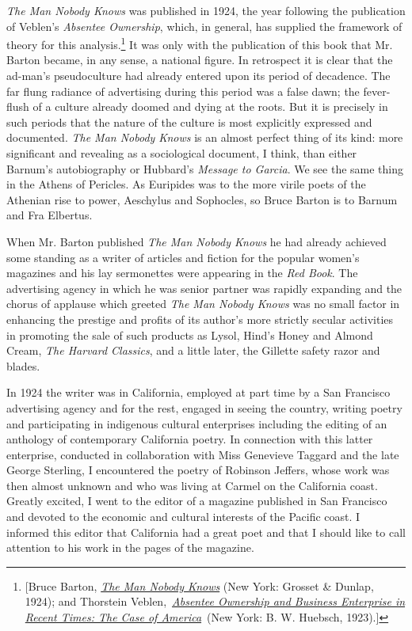 \documentclass[openany,nobib]{tufte-book}
\begin{document}
\emph{The Man Nobody Knows} was published in 1924, the year following
the publication of Veblen's \emph{Absentee Ownership}, which, in
general, has supplied the framework of theory for this analysis.\footnote{{[}Bruce Barton,
  \emph{\href{http://www.worldcat.org/oclc/70421692}{The Man Nobody
  Knows}} (New York: Grosset \& Dunlap, 1924); and Thorstein
  Veblen,~\emph{\href{http://www.worldcat.org/oclc/752183}{Absentee
  Ownership and Business Enterprise in Recent Times: The Case of
  America}}~(New York: B. W. Huebsch, 1923).{]}} It
was only with the publication of this book that Mr. Barton became, in
any sense, a national figure. In retrospect it is clear that the
ad-man's pseudoculture had already entered upon its period of decadence.
The far flung radiance of advertising during this period was a false
dawn; the fever-flush of a culture already doomed and dying at the
roots. But it is precisely in such periods that the nature of the
culture is most explicitly expressed and documented. \emph{The Man
Nobody Knows} is an almost perfect thing of its kind: more significant
and revealing as a sociological document, I think, than either Barnum's
autobiography or Hubbard's \emph{Message to Garcia}. We see the same
thing in the Athens of Pericles. As Euripides was to the more virile
poets of the Athenian rise to power, Aeschylus and Sophocles, so Bruce
Barton is to Barnum and Fra Elbertus.

When Mr. Barton published \emph{The Man Nobody Knows} he had already
achieved some standing as a writer of articles and fiction for the
popular women's magazines and his lay sermonettes were appearing in the
\emph{Red Book}. The advertising agency in which he was senior partner
was rapidly expanding and the chorus of applause which greeted \emph{The
Man Nobody Knows} was no small factor in enhancing the prestige and
profits of its author's more strictly secular activities in promoting
the sale of such products as Lysol, Hind's Honey and Almond Cream,
\emph{The Harvard Classics}, and a little later, the Gillette safety
razor and blades.

In 1924 the writer was in California, employed at part time by a San
Francisco advertising agency and for the rest, engaged in seeing the
country, writing poetry and participating in indigenous cultural
enterprises including the editing of an anthology of contemporary
California poetry. In connection with this latter enterprise, conducted
in collaboration with Miss Genevieve Taggard and the late George
Sterling, I encountered the poetry of Robinson Jeffers, whose work was
then almost unknown and who was living at Carmel on the California
coast. Greatly excited, I went to the editor of a magazine published in
San Francisco and devoted to the economic and cultural interests of the
Pacific coast. I informed this editor that California had a great poet
and that I should like to call attention to his work in the pages of the
magazine.
\end{document}
